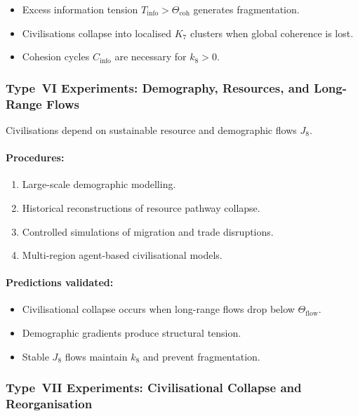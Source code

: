 \begin{itemize}
    \item Excess information tension $T_{\mathrm{info}} > \Theta_{\mathrm{coh}}$ 
          generates fragmentation.
    \item Civilisations collapse into localised $K_7$ clusters when 
          global coherence is lost.
    \item Cohesion cycles $C_{\mathrm{info}}$ are necessary for $k_8 > 0$.
\end{itemize}



\subsubsection{Type~VI Experiments: Demography, Resources, and Long-Range Flows}

Civilisations depend on sustainable resource and demographic flows $J_8$.

\paragraph{Procedures:}

\begin{enumerate}
    \item Large-scale demographic modelling.
    \item Historical reconstructions of resource pathway collapse.
    \item Controlled simulations of migration and trade disruptions.
    \item Multi-region agent-based civilisational models.
\end{enumerate}

\paragraph{Predictions validated:}

\begin{itemize}
    \item Civilisational collapse occurs when long-range flows drop below
          $\Theta_{\mathrm{flow}}$.
    \item Demographic gradients produce structural tension.
    \item Stable $J_8$ flows maintain $k_8$ and prevent fragmentation.
\end{itemize}



\subsubsection{Type~VII Experiments: Civilisational Collapse and Reorganisation}

